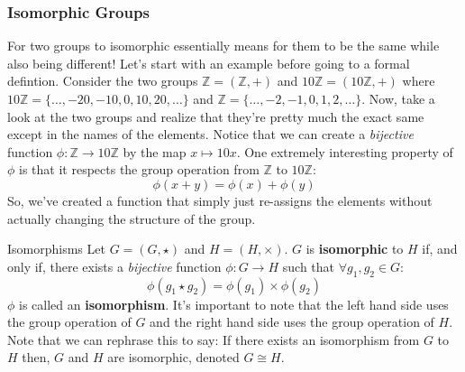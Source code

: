 \subsubsection{Isomorphic Groups}
For two groups to isomorphic essentially means for them to be the same while also being different! Let's start with an example before going to a formal defintion. Consider the two groups $\mathbb{Z} = (\mathbb{Z}, +)$ and $10\mathbb{Z} = (10\mathbb{Z}, +)$ where $10\mathbb{Z} = \{\dots, -20, -10, 0 , 10 , 20, \dots\}$ and $\mathbb{Z} = \{\dots, -2, -1, 0, 1, 2, \dots\}$. Now, take a look at the two groups and realize that they're pretty much the exact same except in the names of the elements. Notice that we can create a \textit{bijective} function $\phi:\mathbb{Z} \to 10\mathbb{Z}$ by the map $x\mapsto 10x$. One extremely interesting property of $\phi$ is that it respects the group operation from $\mathbb{Z}$ to $10\mathbb{Z}$:
\begin{equation*}
	\phi(x + y) = \phi(x) + \phi(y)
\end{equation*}
So, we've created a function that simply just re-assigns the elements without actually changing the structure of the group. \\
\begin{definition}{Isomorphisms}{}
	Let $G = (G, \star)$ and $H = (H, \times)$. $G$ is \textbf{isomorphic} to $H$ if, and only if, there exists a \textit{bijective} function $\phi: G \to H$ such that $\forall g_1, g_2\in G$:
	\begin{equation*}
		\phi(g_1 \star g_2) = \phi(g_1) \times \phi(g_2)
	\end{equation*}
	$\phi$ is called an \textbf{isomorphism}. It's important to note that the left hand side uses the group operation of $G$ and the right hand side uses the group operation of $H$. Note that we can rephrase this to say: If there exists an isomorphism from $G$ to $H$ then, $G$ and $H$ are isomorphic, denoted $G \cong H$. \\
\end{definition}

